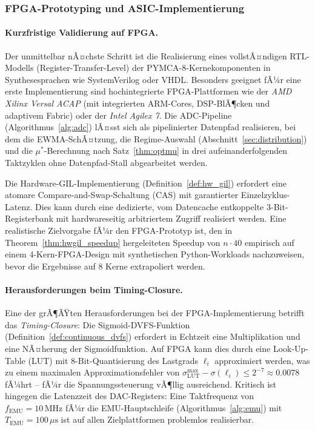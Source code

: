 ﻿\documentclass[a4paper,12pt]{scrreprt}
\theoremstyle{definition}
\begin{document}
	\subsubsection{FPGA-Prototyping und ASIC-Implementierung}

	\paragraph{Kurzfristige Validierung auf FPGA.}
	Der unmittelbar nÃ¤chste Schritt ist die Realisierung eines vollstÃ¤ndigen
	RTL-Modells (Register-Transfer-Level) der PYMCA-8-Kernekom\-ponenten in
	Synthesesprachen wie SystemVerilog oder VHDL. Besonders geeignet fÃ¼r eine
	erste Implementierung sind hochintegrierte FPGA-Plattformen wie der
	\emph{AMD Xilinx Versal ACAP} (mit integrierten ARM-Cores, DSP-BlÃ¶cken und
	adaptivem Fabric) oder der \emph{Intel Agilex 7}. Die ADC-Pipeline
	(Algorithmus~\ref{alg:adc}) lÃ¤sst sich als pipelinierter Datenpfad realisieren,
	bei dem die EWMA-SchÃ¤tzung, die Regime-Auswahl (Abschnitt~\ref{sec:distribution})
	und die $\mu^*$-Berechnung nach Satz~\ref{thm:optmu} in drei aufeinanderfolgenden
	Taktzyklen ohne Datenpfad-Stall abgearbeitet werden.

	Die Hardware-GIL-Implementierung (Definition~\ref{def:hw_gil}) erfordert eine
	atomare Compare-and-Swap-Schaltung (CAS) mit garantierter Einzelzyklus-Latenz.
	Dies kann durch eine dedizierte, vom Datencache entkoppelte 3-Bit-Registerbank
	mit hardwareseitig arbitriertem Zugriff realisiert werden. Eine realistische
	Zielvorgabe fÃ¼r den FPGA-Prototyp ist, den in Theorem~\ref{thm:hwgil_speedup}
	hergeleiteten Speedup von $n \cdot 40$ empirisch auf einem 4-Kern-FPGA-Design
	mit synthetischen Python-Workloads nachzuweisen, bevor die Ergebnisse auf
	8 Kerne extrapoliert werden.

	\paragraph{Herausforderungen beim Timing-Closure.}
	Eine der grÃ¶ÃŸten Herausforderungen bei der FPGA-Implementierung betrifft das
	\emph{Timing-Closure}: Die Sigmoid-DVFS-Funktion (Definition~\ref{def:continuous_dvfs})
	erfordert in Echtzeit eine Multiplikation und eine NÃ¤herung der Sigmoidfunktion.
	Auf FPGA kann dies durch eine Look-Up-Table (LUT) mit 8-Bit-Quantisierung des
	Lastgrads $\ell_i$ approximiert werden, was zu einem maximalen Approximationsfehler
	von $\sigma_{\mathrm{LUT}}^{\max} - \sigma(\ell_i) \le 2^{-7} \approx 0.0078$ fÃ¼hrt
	-- fÃ¼r die Spannungssteuerung vÃ¶llig ausreichend. Kritisch ist hingegen die
	Latenzzeit des DAC-Registers: Eine Taktfrequenz von $f_{\mathrm{EMU}} = 10\,\mathrm{MHz}$
	fÃ¼r die EMU-Hauptschleife (Algorithmus~\ref{alg:emu}) mit $T_{\mathrm{EMU}} = 100\,\mu\mathrm{s}$
	ist auf allen Zielplattformen problemlos realisierbar.
\end{document}

